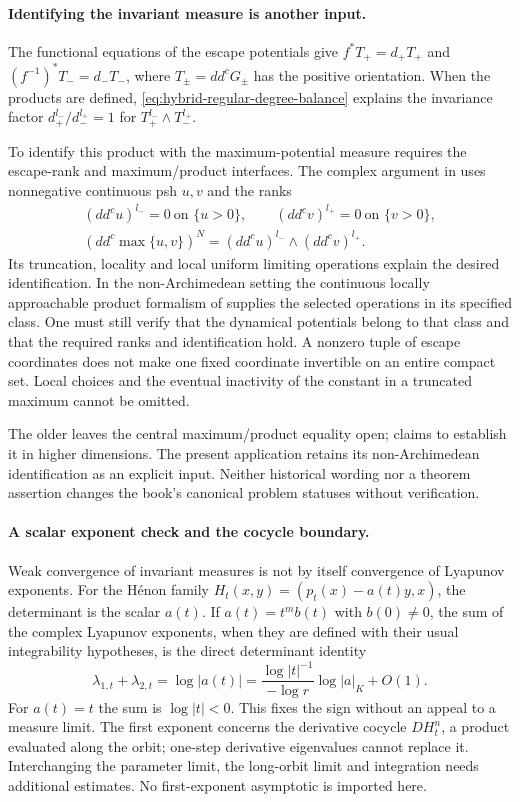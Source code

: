 \paragraph{Identifying the invariant measure is another input.}
The functional equations of the escape potentials give
$f^*T_+=d_+T_+$ and $(f^{-1})^*T_-=d_-T_-$, where
$T_\pm=dd^cG_\pm$ has the positive orientation. When the products
are defined, \eqref{eq:hybrid-regular-degree-balance} explains the
invariance factor $d_+^{l_-}/d_-^{l_+}=1$ for
$T_+^{l_-}\wedge T_-^{l_+}$.

To identify this product with the maximum-potential measure requires
the escape-rank and maximum/product interfaces. The complex argument
in \cite[Lemma~2.12]{GuedjSibony02Author} uses nonnegative continuous
psh $u,v$ and the ranks
\[
\begin{gathered}
 (dd^cu)^{l_-}=0\ \text{on }\{u>0\},\qquad
 (dd^cv)^{l_+}=0\ \text{on }\{v>0\},\\
 (dd^c\max\{u,v\})^N=(dd^cu)^{l_-}\wedge(dd^cv)^{l_+}.
\end{gathered}
\tag{66.29j}\label{eq:hybrid-escape-rank-identification}
\]
Its truncation, locality and local uniform limiting operations explain
the desired identification. In the non-Archimedean setting the
continuous locally approachable product formalism of \cite{CLD25}
supplies the selected operations in its specified class. One must
still verify that the dynamical potentials belong to that class and
that the required ranks and identification hold. A nonzero tuple
of escape coordinates does not make one fixed coordinate invertible
on an entire compact set. Local choices and the eventual inactivity
of the constant in a truncated maximum cannot be omitted.

The older \cite[Remark~2.6]{Irokawa23HenonV2} leaves the central
maximum/product equality open; \cite[Theorem~4.4]{Irokawa26RegularV1}
claims to establish it in higher dimensions. The present application
retains its non-Archimedean identification as an explicit input.
Neither historical wording nor a theorem assertion changes the
book's canonical problem statuses without verification.

\paragraph{A scalar exponent check and the cocycle boundary.}
Weak convergence of invariant measures is not by itself convergence
of Lyapunov exponents. For the H\'enon family
$H_t(x,y)=(p_t(x)-a(t)y,x)$, the determinant is the scalar $a(t)$.
If $a(t)=t^m b(t)$ with $b(0)\neq0$, the sum of the complex
Lyapunov exponents, when they are defined with their usual
integrability hypotheses, is the direct determinant identity
\[
 \lambda_{1,t}+\lambda_{2,t}
   =\log|a(t)|
   =\frac{\log|t|^{-1}}{-\log r}\log|a|_K+O(1).
\tag{66.29k}\label{eq:hybrid-henon-total-exponent}
\]
For $a(t)=t$ the sum is $\log|t|<0$. This fixes the sign without
an appeal to a measure limit. The first exponent concerns the
derivative cocycle $DH_t^n$, a product evaluated along the orbit;
one-step derivative eigenvalues cannot replace it. Interchanging
the parameter limit, the long-orbit limit and integration needs
additional estimates. No first-exponent asymptotic is imported here.

